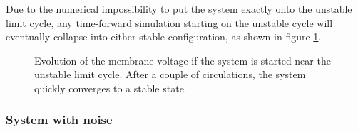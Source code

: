 \documentclass[12pt,a4paper]{article}
\begin{document}
Due to the numerical impossibility to put the system exactly onto the unstable limit cycle, any time-forward simulation starting on the unstable cycle will eventually collapse into either stable configuration, as shown in figure \ref{divergent}.
\begin{figure}[H]
	\caption{Evolution of the membrane voltage if the system is started near the unstable limit cycle. After a couple of circulations, the system quickly converges to a stable state.}
	\label{divergent} 
\end{figure}
\subsubsection{System with noise}
\end{document}
